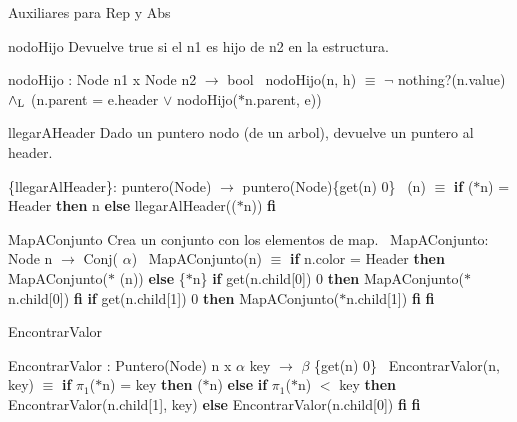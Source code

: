 \begin{DoxyVerb}Auxiliares para Rep y Abs
\end{DoxyVerb}


\begin{DoxyParagraph}{nodo\+Hijo}
Devuelve true si el n1 es hijo de n2 en la estructura.

nodo\+Hijo \+: Node n1 x Node n2 $\to$ bool~\newline
nodo\+Hijo(n, h) $\equiv$ $\lnot$ nothing?(n.\+value) $\land_{\rm L}$ (n.\+parent = e.\+header $\lor$ nodo\+Hijo($\ast$n.parent, e)) 
\end{DoxyParagraph}


\begin{DoxyParagraph}{llegar\+A\+Header}
Dado un puntero nodo (de un arbol), devuelve un puntero al header.

\{llegar\+Al\+Header\}\+: puntero(\+Node) $\to$ puntero(\+Node)\{get(n)  0\}~\newline
(n) $\equiv$ {\bfseries if} ($\ast$n) = Header {\bfseries then} n {\bfseries else} llegar\+Al\+Header(($\ast$n)) {\bfseries fi} 


\end{DoxyParagraph}
\begin{DoxyParagraph}{Map\+A\+Conjunto}
Crea un conjunto con los elementos de map.~\newline
 Map\+A\+Conjunto\+: Node n $\to$ Conj( $\alpha$)~\newline
Map\+A\+Conjunto(n) $\equiv$ {\bfseries if} n.\+color = Header {\bfseries then} Map\+A\+Conjunto($\ast$ (n)) {\bfseries else} \{$\ast$n\}  {\bfseries if} get(n.\+child\mbox{[}0\mbox{]})  0 {\bfseries then} Map\+A\+Conjunto($\ast$n.child\mbox{[}0\mbox{]}) {\bfseries fi}  {\bfseries if} get(n.\+child\mbox{[}1\mbox{]})  0 {\bfseries then} Map\+A\+Conjunto($\ast$n.child\mbox{[}1\mbox{]}) {\bfseries fi} {\bfseries fi} 
\end{DoxyParagraph}


\begin{DoxyParagraph}{Encontrar\+Valor}


Encontrar\+Valor \+: Puntero(\+Node) n x $\alpha$ key $\to$ $\beta$ \{get(n)  0\}~\newline
Encontrar\+Valor(n, key) $\equiv$ {\bfseries if} $\pi_1$($\ast$n) = key {\bfseries then} ($\ast$n) {\bfseries else} {\bfseries if} $\pi_1$($\ast$n) $<$ key {\bfseries then} Encontrar\+Valor(n.\+child\mbox{[}1\mbox{]}, key) {\bfseries else} Encontrar\+Valor(n.\+child\mbox{[}0\mbox{]}) {\bfseries fi} {\bfseries fi} 
\end{DoxyParagraph}


